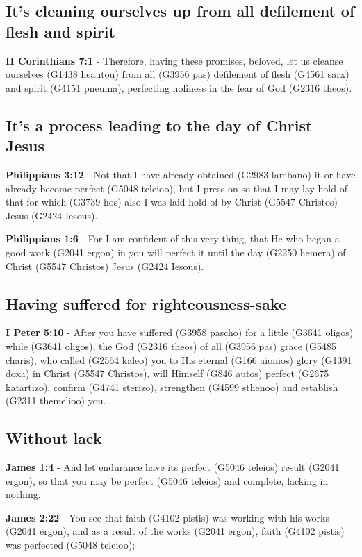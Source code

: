 \documentclass[11pt]{article}
\begin{document}
\subsection{It's cleaning ourselves up from all defilement of flesh and spirit}
\label{sec:org3191b8a}
\textbf{II Corinthians 7:1} - Therefore, having these promises, beloved, let us cleanse ourselves (G1438 heautou) from all (G3956 pas) defilement of flesh (G4561 sarx) and spirit (G4151 pneuma), perfecting holiness in the fear of God (G2316 theos).

\subsection{It's a process leading to the day of Christ Jesus}
\label{sec:org3ed3373}
\textbf{Philippians 3:12} - Not that I have already obtained (G2983 lambano) it or have already become perfect (G5048 teleioo), but I press on so that I may lay hold of that for which (G3739 hos) also I was laid hold of by Christ (G5547 Christos) Jesus (G2424 Iesous).

\textbf{Philippians 1:6} - For I am confident of this very thing, that He who began a good work (G2041 ergon) in you will perfect it until the day (G2250 hemera) of Christ (G5547 Christos) Jesus (G2424 Iesous).

\subsection{Having suffered for righteousness-sake}
\label{sec:orgf982f5b}
\textbf{I Peter 5:10} - After you have suffered (G3958 pascho) for a little (G3641 oligos) while (G3641 oligos), the God (G2316 theos) of all (G3956 pas) grace (G5485 charis), who called (G2564 kaleo) you to His eternal (G166 aionios) glory (G1391 doxa) in Christ (G5547 Christos), will Himself (G846 autos) perfect (G2675 katartizo), confirm (G4741 sterizo), strengthen (G4599 sthenoo) and establish (G2311 themelioo) you.

\subsection{Without lack}
\label{sec:orge88890e}
\textbf{James 1:4} - And let endurance have its perfect (G5046 teleios) result (G2041 ergon), so that you may be perfect (G5046 teleios) and complete, lacking in nothing.

\textbf{James 2:22} - You see that faith (G4102 pistis) was working with his works (G2041 ergon), and as a result of the works (G2041 ergon), faith (G4102 pistis) was perfected (G5048 teleioo);
\end{document}

